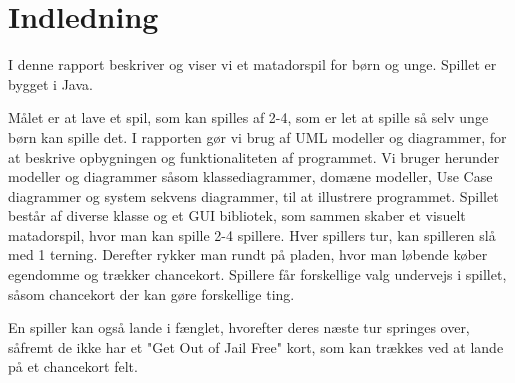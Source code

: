 \section{Indledning}
I denne rapport beskriver og viser vi et matadorspil for børn og unge. Spillet er bygget i Java. 

Målet er at lave et spil, som kan spilles af 2-4, som er let at spille så selv unge børn kan spille det. I rapporten gør vi brug af UML modeller og diagrammer, for at beskrive opbygningen og funktionaliteten af programmet. Vi bruger herunder modeller og diagrammer såsom klassediagrammer, domæne modeller, Use Case diagrammer og system sekvens diagrammer, til at illustrere programmet. 
\medskip
Spillet består af diverse klasse og et GUI bibliotek, som sammen skaber et visuelt matadorspil, hvor man kan spille 2-4 spillere. Hver spillers tur, kan spilleren slå med 1 terning. Derefter rykker man rundt på pladen, hvor man løbende køber egendomme og trækker chancekort. Spillere får forskellige valg undervejs i spillet, såsom chancekort der kan gøre forskellige ting. 

En spiller kan også lande i fænglet, hvorefter deres næste tur springes over, såfremt de ikke har et "Get Out of Jail Free" kort, som kan trækkes ved at lande på et chancekort felt. 
